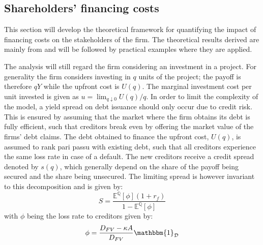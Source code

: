 \documentclass[../main.tex]{subfiles}
\begin{document}
    \subsection{Shareholders' financing costs}
        This section will develop the theoretical framework for quantifying the impact of financing costs on the stakeholders of the firm.
        The theoretical results derived are mainly from \cite{ADS2019} and will be followed by practical examples where they are applied.


        The analysis will still regard the firm considering an investment in a project.
        For generality the firm considers investing in $q$ units of the project; 
        the payoff is therefore $qY$ while the upfront cost is $U(q)$. 
        The marginal investment cost per unit invested is given as 
        $u = \lim_{q\downarrow 0} U(q) / q$.
        In order to limit the complexity of the model, a yield spread on debt issuance should only occur due to credit risk. 
        This is ensured by assuming that the market where the firm obtains its debt is fully efficient, 
        such that creditors break even by offering the market value of the firms' debt claims.
        The debt obtained to finance the upfront cost, $U(q)$, is assumed to rank pari passu with existing debt, 
        such that all creditors experience the same loss rate in case of a default.
        The new creditors receive a credit spread denoted by $s(q)$,
        which generally depend on the share of the payoff being secured and the share being unsecured.
        The limiting spread is however invariant to this decomposition and is given by:
            \begin{equation}
                S = \frac{
                    \mathbb{E}^{\mathbb{Q}}\left[\phi\right] 
                    (1 + r_{f})
                }{
                    1 - \mathbb{E}^{\mathbb{Q}}\left[\phi\right]
                }
            \end{equation}
        with $\phi$ being the loss rate to creditors given by:
            \begin{equation}
                \phi = \frac{
                        D_{FV} - \kappa A
                    }{
                        D_{FV}
                    } 
                \mathbbm{1}_{\mathcal{D}}
            \end{equation}
\end{document}
